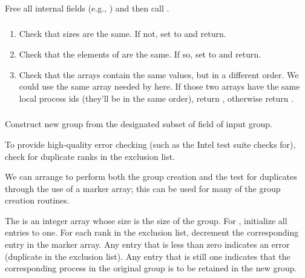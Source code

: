 \documentclass{article}
\begin{document}
\subsubsection{}
Free all internal fields (e.g., ) and then
call . 

\subsubsection{}
\begin{enumerate}
\item Check that sizes are the same.  If not, set  to
   and return.
\item Check that the elements of  are the same.  If so,
set  to  and return.
\item Check that the  arrays
  contain the same values, but 
  in a different order.  We could use the same array needed by
   here.  If those two arrays have the same
  local process ids (they'll be in the same order), return
  , otherwise return 
  .  
\end{enumerate}

\subsubsection{}
  Construct new group from the designated subset of
   field of input group.

  To provide high-quality error checking (such as the Intel test suite
  checks for), check for duplicate ranks in the exclusion list.

  We can arrange to perform both the group creation and the test for
  duplicates through the use of a marker array; this can be used for many of
  the group creation routines.

  The  is an integer array whose size is the size of
  the group.  For , initialize all entries to one.
  For each rank in the exclusion list, decrement the corresponding entry in
  the marker array.  Any entry that is less than zero indicates an error
  (duplicate in the exclusion list).  Any entry that is still one indicates
  that the corresponding process in the original group is to be retained in
  the new group.
\end{document}
